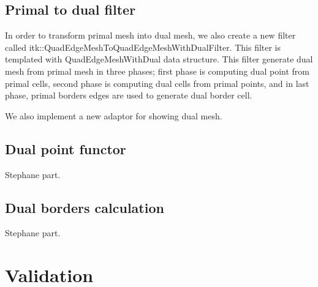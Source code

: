 \documentclass{InsightArticle}
\begin{document}
\subsection{Primal to dual filter }

In order to transform primal mesh into dual mesh, we also create a new filter called itk::QuadEdgeMeshToQuadEdgeMeshWithDualFilter. This filter is templated with QuadEdgeMeshWithDual data structure. This filter generate dual mesh from primal mesh in three phases; first phase is computing dual point from primal cells, second phase is computing dual cells from primal points, and in last phase, primal borders edges are used to generate dual border cell.

We also implement a new adaptor for showing dual mesh.


\subsection{Dual point functor}
Stephane part.

\subsection{Dual borders calculation}
Stephane part.

\section{Validation}


\end{document}
